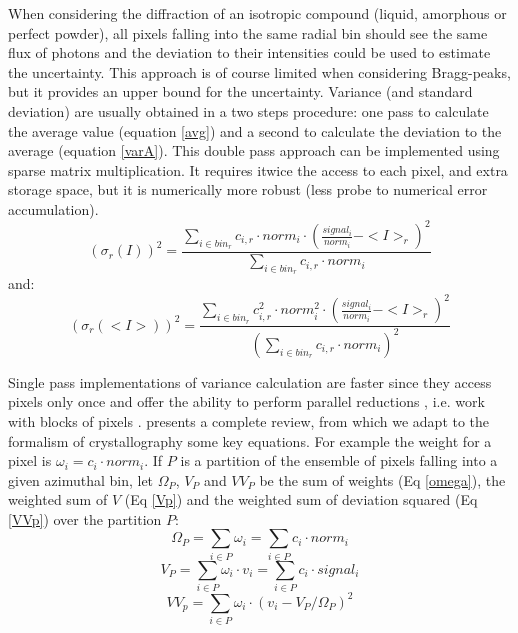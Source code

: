 \documentclass[a4paper,12pt,oneside]{article}              %
\newcommand{\citeasnoun}{\citet}
\begin{document}
When considering the diffraction of an isotropic compound (liquid, amorphous or perfect powder), all pixels falling into the same radial bin should see the same flux of photons and the deviation to their intensities could be used to estimate the uncertainty. 
This approach is of course limited when considering Bragg-peaks, but it provides an upper bound for the uncertainty.
Variance (and standard deviation) are usually obtained in a two steps procedure: one pass to calculate the average value (equation \ref{avg}) and a second to calculate the deviation to the average (equation \ref{varA}). 
This double pass approach can be implemented using sparse matrix multiplication. 
It requires itwice the access to each pixel, and extra storage space, but it is numerically more robust (less probe to numerical error accumulation).
\begin{equation}
\label{varA}
    (\sigma_{r}(I))^2 = \frac {\sum\limits_{i \in bin_r} c_{i,r} \cdot norm_i \cdot (\frac{signal_i}{norm_i}-<I>_r)^2}
                              {\sum\limits_{i \in bin_r} c_{i,r} \cdot norm_i}
\end{equation}
and:
\begin{equation}
\label{varB}
(\sigma_{r}(<I>))^2 = \frac{\sum\limits_{i \in bin_r} c_{i,r}^2 \cdot norm_i^2 \cdot (\frac{signal_i}{norm_i}-<I>_r)^2}
                         {(\sum\limits_{i \in bin_r} c_{i,r} \cdot norm_i)^2}  
\end{equation}


Single pass implementations of variance calculation are faster since they access pixels only once and offer the ability to perform parallel reductions \cite{Blelloch}, i.e. work with blocks of pixels .
\citeasnoun{variance2018} presents a complete review, from which we adapt to the formalism of crystallography some key equations.
For example the weight for a pixel is $\omega_i = c_i \cdot norm_i$.
If $P$ is a partition of the ensemble of pixels falling into a given azimuthal bin, let $\Omega_{P}$, $V_{P}$ and $VV_{P}$  
be the sum of weights (Eq \ref{omega}), the weighted sum of $V$ (Eq \ref{Vp}) and the weighted sum of deviation squared (Eq \ref{VVp}) over the partition $P$: 
\begin{equation}
\label{omega}
\Omega_{P} = \sum\limits_{i \in P} \omega_i = \sum\limits_{i \in P} c_i \cdot norm_i 
\end{equation}
\begin{equation}
\label{Vp}
V_{P} = \sum\limits_{i \in P} \omega_i \cdot v_i =  \sum\limits_{i \in P} c_i \cdot signal_i
\end{equation}
\begin{equation}
\label{VVp}
VV_{p} = \sum\limits_{i \in P} \omega_i \cdot (v_i - V_{P}/\Omega_{P})^2 
\end{equation}
\end{document}
